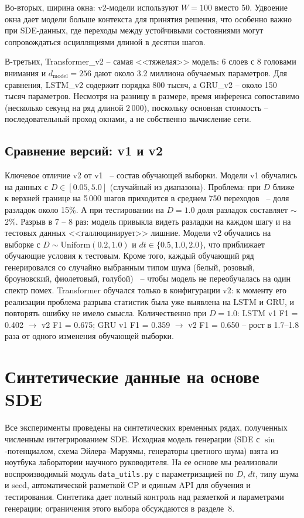 \documentclass[12pt,a4paper]{article}
\begin{document}
Во-вторых, ширина окна: v2-модели используют $W = 100$ вместо 50. Удвоение окна дает модели больше контекста для принятия решения, что особенно важно при SDE-данных, где переходы между устойчивыми состояниями могут сопровождаться осцилляциями длиной в десятки шагов.

В-третьих, Transformer\_v2  -- самая <<тяжелая>> модель: 6 слоев с 8 головами внимания и $d_{\text{model}} = 256$ дают около 3.2 миллиона обучаемых параметров. Для сравнения, LSTM\_v2 содержит порядка 800 тысяч, а GRU\_v2  -- около 150 тысяч параметров. Несмотря на разницу в размере, время инференса сопоставимо (несколько секунд на ряд длиной 2\,000), поскольку основная стоимость  -- последовательный проход окнами, а не собственно вычисление сети.

\subsection{Сравнение версий: v1 и v2}

Ключевое отличие v2 от v1~ -- состав обучающей выборки. Модели v1 обучались на данных с $D \in [0.05, 5.0]$ (случайный из диапазона). Проблема: при $D$ ближе к верхней границе на 5\,000 шагов приходится в среднем 750 переходов~ -- доля разладок около 15\%. А при тестировании на $D = 1.0$ доля разладок составляет $\sim$2\%. Разрыв в 7 -- 8 раз: модель привыкла видеть разладки на каждом шагу и на тестовых данных <<галлюцинирует>> лишние. Модели v2 обучались на выборке с $D \sim \text{Uniform}(0.2, 1.0)$ и $dt \in \{0.5, 1.0, 2.0\}$, что приближает обучающие условия к тестовым. Кроме того, каждый обучающий ряд генерировался со случайно выбранным типом шума (белый, розовый, броуновский, фиолетовый, голубой)~ -- чтобы модель не переобучалась на один спектр помех. Transformer обучался только в конфигурации v2: к моменту его реализации проблема разрыва статистик была уже выявлена на LSTM и GRU, и повторять ошибку не имело смысла. Количественно при $D = 1.0$: LSTM v1 F1 = 0.402 $\to$ v2 F1 = 0.675; GRU v1 F1 = 0.359 $\to$ v2 F1 = 0.650 -- рост в 1.7--1.8 раза от одного изменения обучающей выборки.
\section{Синтетические данные на основе SDE}

Все эксперименты проведены на синтетических временных рядах, полученных численным интегрированием SDE. Исходная модель генерации (SDE с $\sin$-потенциалом, схема Эйлера--Маруямы, генераторы цветного шума) взята из ноутбука лаборатории научного руководителя. На ее основе мы реализовали воспроизводимый модуль \texttt{data\_utils.py} с параметризацией по $D$, $dt$, типу шума и seed, автоматической разметкой CP и единым API для обучения и тестирования. Синтетика дает полный контроль над разметкой и параметрами генерации; ограничения этого выбора обсуждаются в разделе~8.
\end{document}
